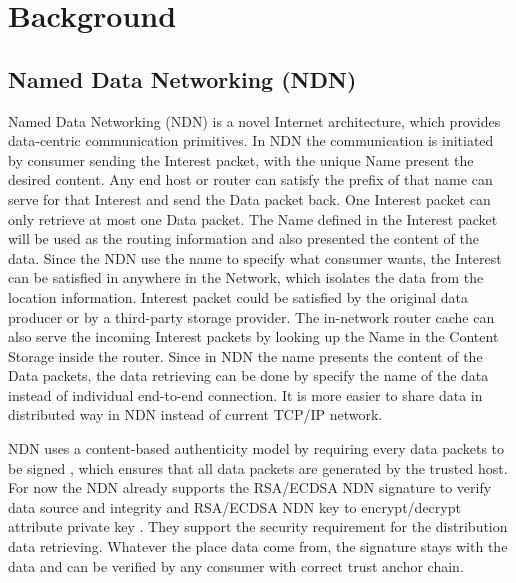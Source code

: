 
\section{Background}

\subsection{Named Data Networking (NDN)}
Named Data Networking (NDN) \cite{zhang2014named} is a novel Internet architecture, which provides data-centric communication primitives. In NDN the communication is initiated by consumer sending the Interest packet, with the unique Name present the desired content. Any end host or router can satisfy the prefix of that name can serve for that Interest and send the Data packet back. One Interest packet can only retrieve at most one Data packet. The Name defined in the Interest packet will be used as the routing information and also presented the content of the data. Since the NDN use the name to specify what consumer wants, the Interest can be satisfied in anywhere in the Network, which isolates the data from the location information. Interest packet could be satisfied by the original data producer or by a third-party storage provider. The in-network router cache can also serve the incoming Interest packets by looking up the Name in the Content Storage inside the router. Since in NDN the name presents the content of the Data packets, the data retrieving can be done by specify the name of the data instead of individual end-to-end connection. It is more easier to share data in distributed way in NDN instead of current TCP/IP network.

NDN uses a content-based authenticity model by requiring every data packets to be signed \cite{yu2015name}, which ensures that all data packets are generated by the trusted host. For now the NDN already supports the RSA/ECDSA NDN signature to verify data source and integrity and RSA/ECDSA NDN key to encrypt/decrypt attribute private key \cite{afanasyev2016content}. They support the security requirement for the distribution data retrieving. Whatever the place data come from, the signature stays with the data and can be verified by any consumer with correct trust anchor chain.

